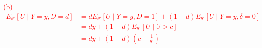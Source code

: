 \documentclass[12pt]{article}
\newcommand{\1}{\mathds 1}
\begin{document}
\begin{enumerate}
\textcolor{red}{
(b) 
\begin{align*}
	E_{\theta'}[U \mid Y = y, D = d] &= d E_{\theta'}[U \mid Y = y, D = 1] + (1 - d) E_{\theta '} [U \mid Y = y, \delta = 0]\\
	&= d y + (1 - d) E_{\theta'} [U \mid U > c]\\
	&= d y + (1 - d) \left(c + \frac 1{\theta'}\right)
\end{align*}
}
\end{enumerate}
\end{document}
